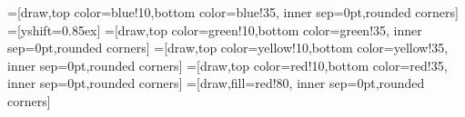 \usepackage{tikz}
\usetikzlibrary{matrix,fit,positioning}
\usepackage[active,tightpage]{preview}
\usepackage{subfig}
\setlength\PreviewBorder{5pt}%

\usepackage{mathabx}

\newcommand*\up{\textcolor{YellowGreen}{$\blacktriangleup$}}
\newcommand*\down{\textcolor{Red}{$\blacktriangledown$}}
\newcommand*\const{\textcolor{darkgray}{\textbf{--}}}
\newcommand*\head[1]{\textbf{#1}}

=[draw,top color=blue!10,bottom color=blue!35,
    inner sep=0pt,rounded corners]
=[yshift=0.85ex]
=[draw,top color=green!10,bottom color=green!35,
    inner sep=0pt,rounded corners]
=[draw,top color=yellow!10,bottom color=yellow!35,
    inner sep=0pt,rounded corners]
=[draw,top color=red!10,bottom color=red!35,
    inner sep=0pt,rounded corners]
=[draw,fill=red!80,
    inner sep=0pt,rounded corners]
